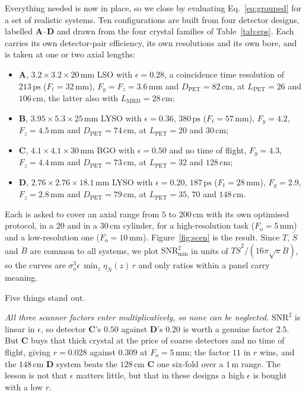 \documentclass[11pt,a4paper]{article}
\newcommand{\Lpet}{L_{\mathrm{PET}}}
\newcommand{\Lmrd}{L_{\mathrm{MRD}}}
\newcommand{\Dpet}{D_{\mathrm{PET}}}
\newcommand{\Fo}{F_{\mathrm{o}}}
\newcommand{\Ft}{F_{t}}
\newcommand{\Fy}{F_{y}}
\newcommand{\Fz}{F_{z}}
\newcommand{\so}{\sigma_{\!o}}
\begin{document}
Everything needed is now in place, so we close by evaluating Eq.~\eqref{eq:grouped} for a
set of realistic systems. Ten configurations are built from four detector designs, labelled \textbf{A}--\textbf{D}
and drawn from the four crystal families of Table~\ref{tab:eps}. Each carries its own
detector-pair efficiency, its own resolutions and its own bore, and is taken at one or two
axial lengths:
\begin{itemize}\setlength{\itemsep}{2pt}
  \item \textbf{A}, $3.2\times3.2\times20\,\mathrm{mm}$ LSO with $\epsilon=0.28$, a
        coincidence time resolution of $213\,\mathrm{ps}$ ($\Ft=32\,\mathrm{mm}$),
        $\Fy=\Fz=3.6\,\mathrm{mm}$ and $\Dpet=82\,\mathrm{cm}$, at $\Lpet=26$ and
        $106\,\mathrm{cm}$, the latter also with $\Lmrd=28\,\mathrm{cm}$;
  \item \textbf{B}, $3.95\times5.3\times25\,\mathrm{mm}$ LYSO with $\epsilon=0.36$,
        $380\,\mathrm{ps}$ ($\Ft=57\,\mathrm{mm}$), $\Fy=4.2$, $\Fz=4.5\,\mathrm{mm}$ and
        $\Dpet=74\,\mathrm{cm}$, at $\Lpet=20$ and $30\,\mathrm{cm}$;
  \item \textbf{C}, $4.1\times4.1\times30\,\mathrm{mm}$ BGO with $\epsilon=0.50$ and no time
        of flight, $\Fy=4.3$, $\Fz=4.4\,\mathrm{mm}$ and $\Dpet=73\,\mathrm{cm}$, at
        $\Lpet=32$ and $128\,\mathrm{cm}$;
  \item \textbf{D}, $2.76\times2.76\times18.1\,\mathrm{mm}$ LYSO with $\epsilon=0.20$,
        $187\,\mathrm{ps}$ ($\Ft=28\,\mathrm{mm}$), $\Fy=2.9$, $\Fz=2.8\,\mathrm{mm}$ and
        $\Dpet=79\,\mathrm{cm}$, at $\Lpet=35$, $70$ and $148\,\mathrm{cm}$.
\end{itemize}
Each is asked to cover an axial range from $5$ to $200\,\mathrm{cm}$ with its own optimised
protocol, in a $20$ and in a $30\,\mathrm{cm}$ cylinder, for a high-resolution task
($\Fo=5\,\mathrm{mm}$) and a low-resolution one ($\Fo=10\,\mathrm{mm}$).
Figure~\ref{fig:scen} is the result. Since $T$, $\dot S$ and $\dot B$ are common to all
systems, we plot $\mathrm{SNR}^2_{\min}$ in units of $T\dot S^{2}/(16\pi\sqrt{\pi}\dot B)$,
so the curves are $\so^{3}\epsilon\,\min_z\eta_N(z)\,r$ and only ratios within a panel carry
meaning.



Five things stand out.

\emph{All three scanner factors enter multiplicatively, so none can be neglected.}
$\mathrm{SNR}^{2}$ is linear in $\epsilon$, so detector \textbf{C}'s $0.50$ against
\textbf{D}'s $0.20$ is worth a genuine factor $2.5$. But \textbf{C} buys that thick crystal
at the price of coarse detectors and no time of flight, giving $r=0.028$ against $0.309$ at
$\Fo=5\,\mathrm{mm}$; the factor $11$ in $r$ wins, and the $148\,\mathrm{cm}$ \textbf{D}
system beats the $128\,\mathrm{cm}$ \textbf{C} one six-fold over a $1\,\mathrm{m}$ range.
The lesson is not that $\epsilon$ matters little, but that in these designs a high $\epsilon$
is bought with a low $r$.
\end{document}

